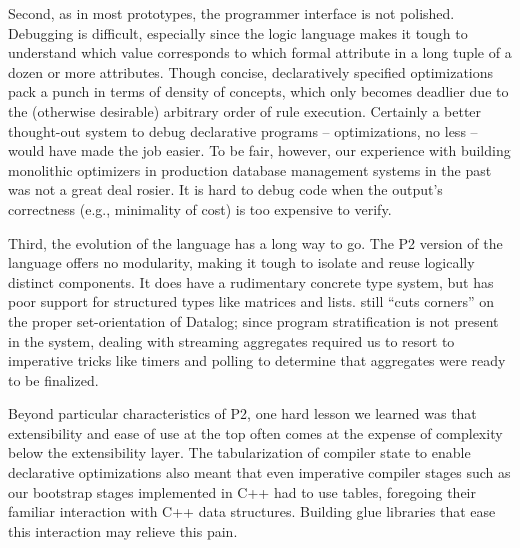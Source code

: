 
Second, as in most prototypes, the programmer interface is not polished.
Debugging is difficult, especially since the logic language makes it tough to
understand which value corresponds to which formal attribute in a long tuple of
a dozen or more attributes.  Though concise, declaratively specified
optimizations pack a punch in terms of density of concepts, which only becomes
deadlier due to the (otherwise desirable) arbitrary order of rule execution.
Certainly a better thought-out system to debug declarative programs --
optimizations, no less -- would have made the job easier.  To be fair, however,
our experience with building monolithic optimizers in production database
management systems in the past was not a great deal rosier.  It is hard to
debug code when the output's correctness (e.g., minimality of cost) is too
expensive to verify.

Third, the evolution of the \OVERLOG language has a long way to go.  The P2
version of the language offers no modularity, making it tough to isolate and
reuse logically distinct components.  It does have a rudimentary concrete type
system, but has poor support for structured types like matrices and lists.
\OVERLOG still ``cuts corners'' on the proper set-orientation of Datalog; since
program stratification is not present in the system, dealing with streaming
aggregates required us to resort to imperative tricks like timers and polling
to determine that aggregates were ready to be finalized.

Beyond particular characteristics of P2, one hard lesson we learned was that
extensibility and ease of use at the top often comes at the expense of
complexity below the extensibility layer.  The tabularization of compiler state
to enable declarative optimizations also meant that even imperative compiler
stages such as our bootstrap stages implemented in C++ had to use tables,
foregoing their familiar interaction with C++ data structures.  Building glue
libraries that ease this interaction may relieve this pain.

